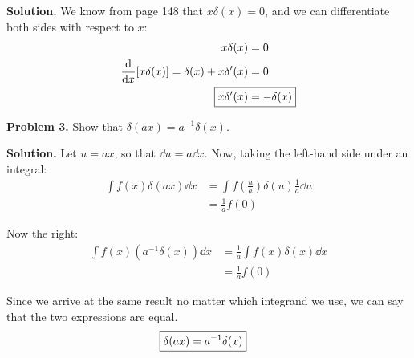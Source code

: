 \documentclass{article}
\begin{document}
\textbf{Solution.} We know from page 148 that $x\delta(x) = 0$, and we can differentiate both sides with respect to $x$:
\begin{equation*}
\begin{aligned}
x\delta(x) &= 0 \\
\frac{\dd}{\dd x}[x\delta(x)] = \delta(x) + x\delta '(x) &= 0 \\
\Aboxed{x\delta '(x) &= -\delta (x)}
\end{aligned}
\end{equation*}

\textbf{Problem 3.} Show that $\delta (ax) = a^{-1}\delta (x)$.

\textbf{Solution.} Let $u = ax$, so that $\dd u = a\dd x$. Now, taking the left-hand side under an integral:
\begin{equation*}
\begin{aligned}
\int f(x)\delta(ax)\dd x &= \int f\left(\frac{u}{a}\right)\delta(u)\frac{1}{a}\dd u \\
&= \frac{1}{a}f(0)
\end{aligned}
\end{equation*}

Now the right:
\begin{equation*}
\begin{aligned}
\int f(x)\left(a^{-1}\delta(x)\right)\dd x &= \frac{1}{a}\int f(x)\delta(x)\dd x \\
&= \frac{1}{a}f(0)
\end{aligned}
\end{equation*}

Since we arrive at the same result no matter which integrand we use, we can say that the two expressions are equal.
\begin{equation*}
\begin{aligned}
\Aboxed{\delta (ax) = a^{-1}\delta (x)}
\end{aligned}
\end{equation*}
\end{document}
